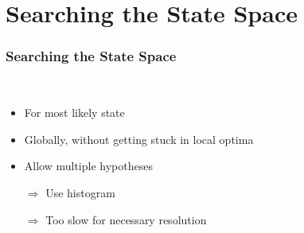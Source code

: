 \section{Searching the State Space}
\begin{frame}
  \frametitle{Searching the State Space}
  \begin{description}[]
  \item[Search the State Space] \hfill \\
  \pause
  \begin{itemize}
  \item For most likely state
  \item Globally, without getting stuck in local optima
  \item Allow multiple hypotheses
  \pause
  \item[$\Rightarrow$] Use histogram
  \pause
  \item[$\Rightarrow$] Too slow for necessary resolution
  \end{itemize}
  \end{description}
\end{frame}

